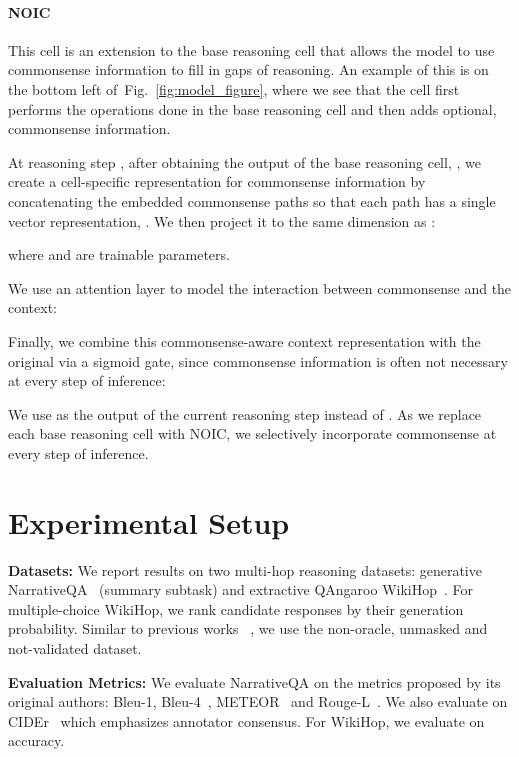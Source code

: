 \documentclass[11pt,a4paper]{article}
\def\figref#1{Fig.~\ref{#1}}
\newcommand{\fullModel}{NOIC}
\begin{document}
\paragraph{\fullModel}
This cell is an extension to the base reasoning cell that allows the model to use commonsense information to fill in gaps of reasoning.
An example of this is on the bottom left of~\figref{fig:model_figure}, where we see that the cell first performs the operations done in the base reasoning cell and then adds optional, commonsense information.

At reasoning step , after obtaining the output of the base reasoning cell, , we create a cell-specific representation for commonsense information
by concatenating the embedded commonsense paths so that each path has a single vector representation, .
We then project it to the same dimension as :

where  and  are trainable parameters.

We use an attention layer to model the interaction between commonsense and the context:




Finally, we combine this commonsense-aware context representation with the original  via a sigmoid gate, since commonsense information is often not necessary at every step of inference:


We use  as the output of the current reasoning step instead of .
As we replace each base reasoning cell with \fullModel, we selectively incorporate commonsense at every step of inference.

  \section{Experimental Setup}

\noindent\textbf{Datasets:} We report results on two multi-hop reasoning datasets: generative NarrativeQA~\cite{kovcisky2017narrativeqa} (summary subtask) and extractive QAngaroo WikiHop~\cite{welbl2017constructing}.
For multiple-choice WikiHop, we rank candidate responses by their generation
probability. Similar to previous works ~\cite{dhingra2018neural}, we use
the non-oracle, unmasked and not-validated dataset.

\noindent\textbf{Evaluation Metrics:}
We evaluate NarrativeQA on the metrics proposed by its original authors: Bleu-1, Bleu-4~\cite{papineni2002bleu}, METEOR~\cite{banerjee2005meteor} and Rouge-L~\cite{lin2004rouge}.
We also evaluate on CIDEr~\cite{vedantam2015cider} which emphasizes annotator consensus.
For WikiHop, we evaluate on accuracy.
\end{document}
